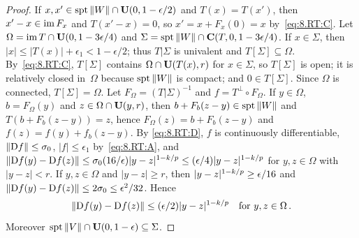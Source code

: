 \begin{proof}
    If $x, x' \in \operatorname{spt} \|W\| \cap \mathbf{U}(0,1 - \epsilon/2)$ and $T(x) = T(x')$, then $x' - x \in
    \operatorname{im} F_x$ and $T(x' - x) = 0$, so $x' = x + F_x(0) = x$ by~\eqref{eq:8.RT:C}. Let $\Omega = \operatorname{im} T
    \cap \mathbf{U}(0,1 - 3\epsilon/4)$ and $\Sigma = \operatorname{spt} \|W\| \cap \mathbf{C} ( T, 0, 1 - 3 \epsilon/4 )$.
    If $x \in \Sigma$, then $|x| \le |T(x)| + \epsilon_1 < 1 - \epsilon/2$; thus $T | \Sigma$ is
    univalent and $T[\Sigma] \subseteq \Omega$. By~\eqref{eq:8.RT:C}, $T[\Sigma]$ contains $\Omega \cap
    \mathbf{U}(T(x),r)$ for $x \in \Sigma$, so $T[\Sigma]$ is open; it is relatively closed in~$\Omega$
    because $\operatorname{spt} \|W\|$ is compact; and $0 \in T[\Sigma]$. Since $\Omega$ is connected, $T[\Sigma] =
    \Omega$. Let $F_\Omega = (T | \Sigma)^{-1}$ and $f = T^\perp \circ F_\Omega$. If $y \in \Omega$, $b
    = F_\Omega(y)$ and $z \in \Omega \cap \mathbf{U}(y,r)$, then $b + F_b(z - y) \in \operatorname{spt} \|W\|$ and
    $T(b + F_b(z - y)) = z$, hence $F_\Omega(z) = b + F_b(z - y)$ and $f(z) = f(y) + f_b(z - y)$. By
    \eqref{eq:8.RT:D}, $f$ is continuously differentiable, $\|\mathrm{D} f\| \le \sigma_0$, $|f| \le
    \epsilon_1$ by~\eqref{eq:8.RT:A}, and $\|\mathrm{D} f(y) - \mathrm{D} f(z)\| \le \sigma_0 (16/\epsilon) |y -
    z|^{1 - k/p} \le (\epsilon/4) |y - z|^{1-k/p}$ for $y, z \in \Omega$ with $|y - z| <
    r$. If $y, z \in \Omega$ and $|y - z| \ge r$, then $|y - z|^{1 - k/p} \ge \epsilon/16$ and
    $\|\mathrm{D} f(y) - \mathrm{D} f(z)\| \le 2 \sigma_0 \le \epsilon^2/32$. Hence
    \begin{equation}
        \label{eq:8.RT:E}
        \|\mathrm{D} f(y) - \mathrm{D} f(z)\| \le (\epsilon/2) |y - z|^{1 - k/p} \quad \text{for $y, z \in
        \Omega$} \,.
    \end{equation}
    Moreover $\operatorname{spt} \|V\| \cap \mathbf{U}(0,1 - \epsilon) \subseteq \Sigma$.


\end{proof}
